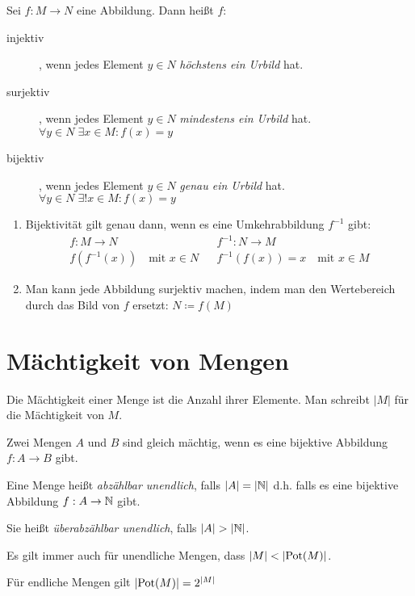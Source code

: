 Sei $f:M\rightarrow N$ eine Abbildung. Dann heißt $f$:
\begin{description}
  \item[injektiv], wenn jedes Element $y\in N$ \emph{höchstens ein Urbild} hat.
  \item[surjektiv], wenn jedes Element $y\in N$ \emph{mindestens ein Urbild} hat. $\forall y\in N\; \exists x\in M : f(x) = y$
  \item[bijektiv], wenn jedes Element $y\in N$ \emph{genau ein Urbild} hat. $\forall y\in N\; \exists! x\in M : f(x) = y$
\end{description}

\bemerkung
\begin{enumerate}
  \item Bijektivität gilt genau dann, wenn es eine Umkehrabbildung $f^{-1}$ gibt:
  \begin{align*}
    f:M\rightarrow N && f^{-1}:N\rightarrow M\\
    f\left(f^{-1}(x)\right) \quad\text{mit }x\in N && f^{-1}\left(f(x)\right)=x \quad\text{mit }x\in M
  \end{align*}
  \item Man kann jede Abbildung surjektiv machen, indem man den Wertebereich durch das Bild von $f$ ersetzt: $N\coloneqq f(M)$
\end{enumerate}

\section{Mächtigkeit von Mengen}
Die Mächtigkeit einer Menge ist die Anzahl ihrer Elemente. Man schreibt $|M|$ für die Mächtigkeit von $M$.

Zwei Mengen $A$ und $B$ sind gleich mächtig, wenn es eine bijektive Abbildung $f:A\rightarrow B$ gibt.

Eine Menge heißt \emph{abzählbar unendlich}, falls $|A|=|\mathbb{N}|$ d.h. falls es eine bijektive Abbildung $f:A\rightarrow \mathbb{N}$ gibt.

Sie heißt \emph{überabzählbar unendlich}, falls $|A|>|\N|$.

Es gilt immer auch für unendliche Mengen, dass $|M| < |\mathrm{Pot}(M)|$.

Für endliche Mengen gilt $|\mathrm{Pot}(M)| = 2^{|M|}$



